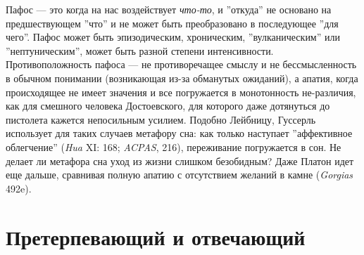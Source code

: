 \documentclass[12pt]{book}
\begin{document}
Пафос --- это когда на нас воздействует \textit{что-то}, и ''откуда'' не основано на предшествующем ''что'' и не может быть преобразовано в последующее ''для чего''. Пафос может быть эпизодическим, хроническим, ''вулканическим'' или ''нептуническим'', может быть разной степени интенсивности. Противоположность пафоса --- не противоречащее смыслу и не бессмысленность в обычном понимании (возникающая из-за обманутых ожиданий), а апатия, когда происходящее не имеет значения и все погружается в монотонность не-различия, как для смешного человека Достоевского, для которого даже дотянуться до пистолета кажется непосильным усилием. Подобно Лейбницу, Гуссерль использует для таких случаев метафору сна: как только наступает ''аффективное облегчение'' (\textit{Hua} XI: 168; \textit{ACPAS}, 216), переживание погружается в сон. Не делает ли метафора сна уход из жизни слишком безобидным? Даже Платон идет еще дальше, сравнивая полную апатию с отсутствием желаний в камне (\textit{Gorgias} 492e).

\section{Претерпевающий и отвечающий}
\end{document}
